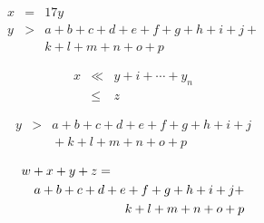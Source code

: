 \documentclass{article}
\begin{document}
\begin{eqnarray}
x & = & 17y\\
y & > & a + b + c + d + e + f + g + h + i + j + \nonumber \\
  &   & k + l + m + n + o + p
\end{eqnarray}

\begin{eqnarray*}
  x & \ll & y+i + \cdots + y_n \\
    & \leq & z
\end{eqnarray*}

\begin{eqnarray*}
y & > & a + b + c + d + e + f + g + h + i + j\\
  &   & \mbox{} + k + l + m + n + o + p
\end{eqnarray*}

\begin{eqnarray*}
\lefteqn{w+x+y+z=}\\
  & & a + b + c + d + e + f + g + h + i + j + \\
  & & k + l + m + n + o + p
\end{eqnarray*}
\end{document}
